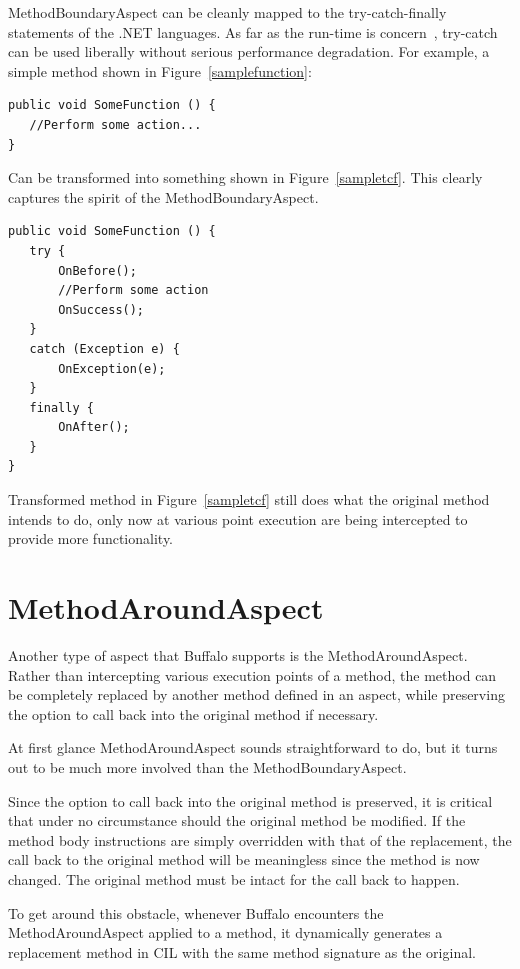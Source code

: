 MethodBoundaryAspect can be cleanly mapped to the try-catch-finally statements of the .NET languages. As far as the run-time is concern~\cite{ecma334, ecma335}, try-catch can be used liberally without serious performance degradation. For example, a simple method shown in Figure~\ref{samplefunction}:

\begin{lstlisting}[caption={Sample function}, label=samplefunction]
public void SomeFunction () {
   //Perform some action...
}
\end{lstlisting}

Can be transformed into something shown in Figure~\ref{sampletcf}. This clearly captures the spirit of the MethodBoundaryAspect.

\begin{lstlisting}[caption={Sample try-catch-finally}, label=sampletcf]
public void SomeFunction () {
   try {
       OnBefore();
       //Perform some action
       OnSuccess();
   }
   catch (Exception e) {
       OnException(e);
   }
   finally {
       OnAfter();
   }
}
\end{lstlisting}

Transformed method in Figure~\ref{sampletcf} still does what the original method intends to do, only now at various point execution are being intercepted to provide more functionality. 

\section{MethodAroundAspect}
Another type of aspect that Buffalo supports is the MethodAroundAspect. Rather than intercepting various execution points of a method, the method can be completely replaced by another method defined in an aspect, while preserving the option to call back into the original method if necessary.

At first glance MethodAroundAspect sounds straightforward to do, but it turns out to be much more involved than the MethodBoundaryAspect.

Since the option to call back into the original method is preserved, it is critical that under no circumstance should the original method be modified. If the method body instructions are simply overridden with that of the replacement, the call back to the original method will be meaningless since the method is now changed. The original method must be intact for the call back to happen.

To get around this obstacle, whenever Buffalo encounters the MethodAroundAspect applied to a method, it dynamically generates a replacement method in CIL with the same method signature as the original.

